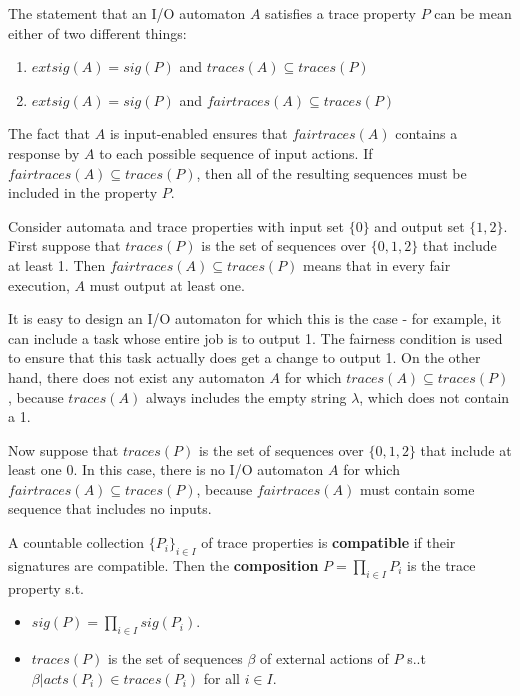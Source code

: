 \documentclass[11pt]{article}
\begin{document}
The statement that an I/O automaton \(A\) satisfies a trace property \(P\) can be mean either of two
different things:
\begin{enumerate}
\item \(extsig(A)=sig(P)\) and \(traces(A)\subseteq traces(P)\)
\item \(extsig(A)=sig(P)\) and \(fairtraces(A)\subseteq traces(P)\)
\end{enumerate}
The fact that \(A\) is input-enabled ensures that \(fairtraces(A)\) contains a response by \(A\) to
each possible sequence of input actions. If \(fairtraces(A)\subseteq traces(P)\), then all of the
resulting sequences must be included in the property \(P\).

\begin{examplle}
Consider automata and trace properties with input set \(\{0\}\) and output set \(\{1,2\}\). First
suppose that \(traces(P)\) is the set of sequences over \(\{0,1,2\}\) that include at least 1. Then
\(fairtraces(A)\subseteq traces(P)\) means that in every fair execution, \(A\) must output at least
one.

It is easy to design an I/O automaton for which this is the case - for example, it can include a task
whose entire job is to output 1. The fairness condition is used to ensure that this task actually does
get a change to output 1. On the other hand, there does not exist any automaton \(A\) for which
\(traces(A)\subseteq traces(P)\), because \(traces(A)\) always includes the empty string \(\lambda\),
which does not contain a 1.

Now suppose that \(traces(P)\) is the set of sequences over \(\{0,1,2\}\) that include at least one 0.
In this case, there is no I/O automaton \(A\) for which \(fairtraces(A)\subseteq traces(P)\), because
\(fairtraces(A)\) must contain some sequence that includes no inputs.
\end{examplle}

A countable collection \(\{P_i\}_{i\in I}\) of trace properties is \textbf{compatible} if their signatures are
compatible. Then the \textbf{composition} \(P=\prod_{i\in I}P_i\) is the trace property s.t.
\begin{itemize}
\item \(sig(P)=\prod_{i\in I}sig(P_i)\).
\item \(traces(P)\) is the set of sequences \(\beta\) of external actions of \(P\) s..t
\(\beta|acts(P_i)\in traces(P_i)\) for all \(i\in I\).
\end{itemize}
\end{document}
